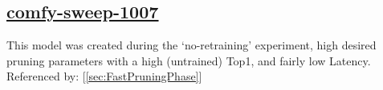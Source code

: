 \documentclass[11pt]{report}
\begin{document}
\subsection*{\protect\href{https://wandb.ai/samfh/Resnet56-Filters-Test/runs/58wpdzct/overview?workspace=}{\underline{\color{blue}comfy-sweep-1007}}}\label{sec:comfy-sweep-1007}
This model was created during the `no-retraining' experiment, high desired pruning parameters with a high (untrained) Top1, and fairly low Latency. \\
Referenced by: [\ref{sec:FastPruningPhase}]
\singlespacing
\begin{figure}[H]
    \begin{table}[H]
        \centering
        \hspace{2em}
    \end{table}    
\end{figure}
\doublespacing
\end{document}
